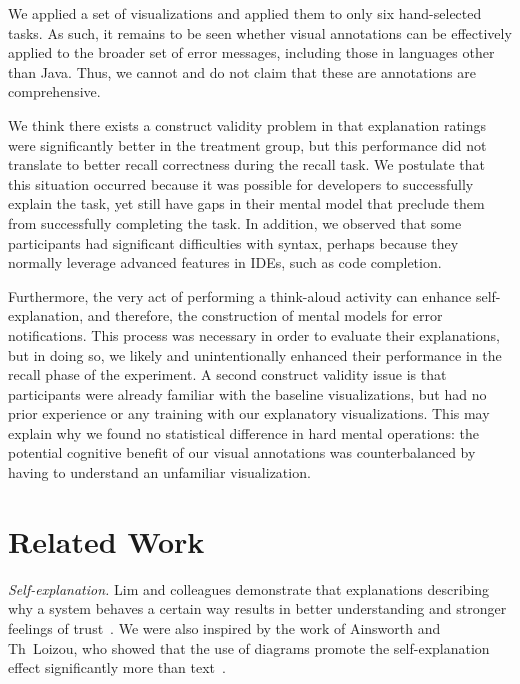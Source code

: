 \documentclass[conference]{IEEEtran}
\begin{document}
We applied a set of visualizations and applied them to only six hand-selected tasks. As such, it remains to be seen whether visual annotations can be effectively applied to the broader set of error messages, including those in languages other than Java. Thus, we cannot and do not claim that these are annotations are comprehensive.

We think there exists a construct validity problem in that explanation ratings were significantly better in the treatment group, but this performance did not translate to better recall correctness during the recall task. We postulate that this situation occurred because it was possible for developers to successfully explain the task, yet still have gaps in their mental model that preclude them from successfully completing the task. In addition, we observed that some participants had significant difficulties with syntax, perhaps because they normally leverage advanced features in IDEs, such as code completion.

Furthermore, the very act of performing a think-aloud activity can enhance self-explanation, and therefore, the construction of mental models for error notifications. This process was necessary in order to evaluate their explanations, but in doing so, we likely and unintentionally enhanced their performance in the recall phase of the experiment. A second construct validity issue is that participants were already familiar with the baseline visualizations, but had no prior experience or any training with our explanatory visualizations. This may explain why we found no statistical difference in hard mental operations: the potential cognitive benefit of our visual annotations was counterbalanced by having to understand an unfamiliar visualization.


\section{Related Work}

\textit{Self-explanation.} Lim and colleagues demonstrate that explanations describing why a system behaves a certain way results in better understanding and stronger feelings of trust~\cite{Lim2009}. We were also inspired by the work of Ainsworth and Th~Loizou, who showed that the use of diagrams promote the self-explanation effect significantly more than text~\cite{Ainsworth2003}.
\end{document}

